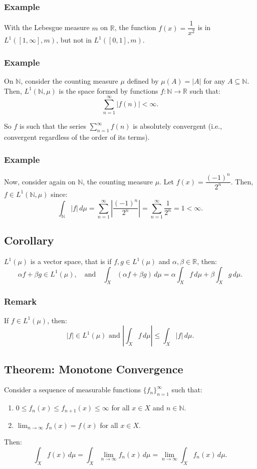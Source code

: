 \documentclass[11pt]{article}
\begin{document}
\subsubsection*{Example}
With the Lebesgue measure \(m\) on \(\mathbb{R}\), the function \(f(x) = \dfrac{1}{x^2}\) is in \(L^1([1, \infty], m)\), but not in \(L^1([0, 1], m)\).

\subsubsection*{Example}
On \(\mathbb{N}\), consider the counting measure \(\mu\) defined by \(\mu(A) = |A|\) for any \(A \subseteq \mathbb{N}\). Then, \(L^1(\mathbb{N}, \mu)\) is the space formed by functions \(f: \mathbb{N} \to \mathbb{R}\) such that:
\[\sum_{n=1}^{\infty} |f(n)| < \infty.\]

So \(f\) is such that the series \(\sum_{n=1}^{\infty} f(n)\) is absolutely convergent (i.e., convergent regardless of the order of its terms).

\subsubsection*{Example}
Now, consider again on \(\mathbb{N}\), the counting measure \(\mu\). Let \(f(x) = \dfrac{(-1)^n}{2^n}\). Then, \(f \in L^1(\mathbb{N}, \mu)\) since:
\[\int_{\mathbb{N}} |f| \,d\mu = \sum_{n=1}^{\infty} \left|\frac{(-1)^n}{2^n}\right| = \sum_{n=1}^{\infty} \frac{1}{2^n} = 1 < \infty.\]

\subsection{Corollary}
\(L^1(\mu)\) is a vector space, that is if \(f, g \in L^1(\mu)\) and \(\alpha, \beta \in \mathbb{R}\), then:
\[\alpha f + \beta g \in L^1(\mu), \quad \text{and} \quad \int_X (\alpha f + \beta g) \,d\mu = \alpha \int_X f \,d\mu + \beta \int_X g \,d\mu.\]

\subsubsection*{Remark}
If \(f \in L^1(\mu)\), then:
\[|f| \in L^1(\mu) \text{ and } \left|\int_X f \,d\mu\right| \leq \int_X |f| \,d\mu.\]

\subsection{Theorem: Monotone Convergence}
Consider a sequence of measurable functions \(\{f_n\}_{n=1}^{\infty}\) such that:
\begin{enumerate}
    \item \(0 \leq f_n(x) \leq f_{n+1}(x) \leq \infty\) for all \(x \in X\) and \(n \in \mathbb{N}\).
    \item \(\lim_{n \to \infty} f_n(x) = f(x)\) for all \(x \in X\).
\end{enumerate}
Then:
\[\int_X f(x) \,d\mu = \int_X \lim_{n \to \infty} f_n(x) \,d\mu = \lim_{n \to \infty} \int_X f_n(x) \,d\mu.\]
\end{document}
